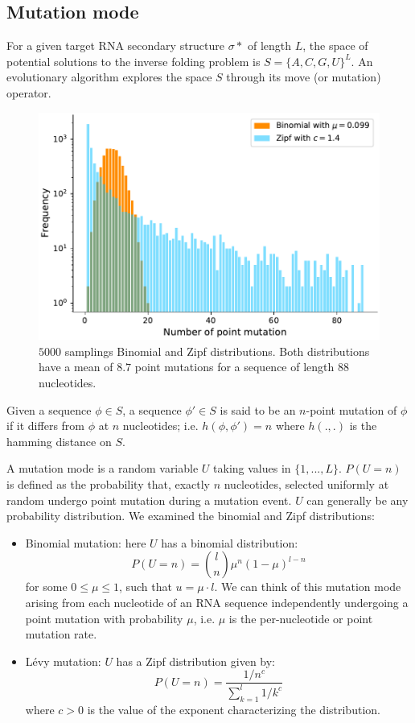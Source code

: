 \subsection*{Mutation mode}
For a given target RNA secondary structure $\sigma*$ of length $L$, the space of potential solutions to the inverse folding problem is $S=\{A,C,G,U\}^L$.
An evolutionary algorithm explores the space $S$ through its move (or mutation) operator.
\begin{figure}[t!]
	\centering
	\includegraphics[width=1.0 \linewidth]{../res/images/arnaque/bino_zipf.pdf}
	\caption{$5000$ samplings Binomial and Zipf distributions. Both distributions have a mean of $8.7$ point mutations for a sequence of length $88$ nucleotides.}\label{Fig:histomut}
\end{figure}
Given a sequence $\phi \in S$, a sequence $\phi' \in S$ is said to be an $n$-point mutation of $\phi$ if it differs from $\phi$ at $n$ nucleotides; i.e. $h(\phi, \phi')=n$ where $h(.,.)$ is the hamming distance on $S$. 

A mutation mode is a random variable $U$ taking values in $\{1,...,L\}$. $P(U=n)$ is defined as the probability that, exactly $n$ nucleotides, selected uniformly at random undergo point mutation during a mutation event. $U$ can generally be any probability distribution. We examined the binomial and Zipf distributions:

\begin{itemize}
	\item Binomial mutation: here $U$ has a binomial distribution: 
	$$
	P(U=n)= \binom{l}{n} \mu^n (1-\mu)^{l-n}
	$$
	for some $0 \leq \mu \leq 1$, such that $u=\mu \cdot l$. We can think of this mutation mode arising from each nucleotide of an RNA sequence independently undergoing a point mutation with probability $\mu$, i.e. $\mu$ is the per-nucleotide or point mutation rate. 
	
	\item Lévy mutation: $U$ has a Zipf distribution given by: 
	$$
	P(U=n)= \frac{1/n^c}{ \sum_{k=1}^{l}{1/k^c}}
	$$
	where $c>0$ is the value of the exponent characterizing the distribution.
\end{itemize}

